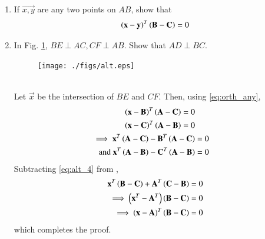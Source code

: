 \documentclass[journal,12pt,twocolumn]{IEEEtran}
\renewcommand\thesection{\arabic{section}}
\begin{document}
\begin{enumerate}[label=\thesection.\arabic*
,ref=\thesection.\theenumi]
\begin{equation}
\end{equation}
%
\item If $\vec{x,y}$ are any two points on $AB$, show that 
\begin{equation}
\label{eq:orth_any}
\left(\mathbf{x}-\mathbf{y}\right)^T\left(\mathbf{B}-\mathbf{C}\right) = 0
\end{equation}
%
\item In Fig. \ref{fig:alt}, $BE \perp AC, CF \perp AB$.  Show that $AD \perp BC$.
\begin{figure}[!hb]
\centering
\texttt{[image: ./figs/alt.eps]}
\caption{}
\label{fig:alt}
\end{figure}
\\
\solution Let $\vec{x}$ be the intersection of $BE$ and $CF$. Then, using 
\eqref{eq:orth_any},
\begin{align}
\label{eq:alt_1}
\begin{split}
\left(\mathbf{x}-\mathbf{B}\right)^T
\left(\mathbf{A}-\mathbf{C}\right) &= 0
\\
\left(\mathbf{x}-\mathbf{C}\right)^T
\left(\mathbf{A}-\mathbf{B}\right) &=0
\end{split}
\\
\label{eq:alt_3}
\implies \mathbf{x}^T\left(\mathbf{A}-\mathbf{C}\right)-\mathbf{B}^T\left(\mathbf{A}-\mathbf{C}\right) &= 0
\\
\text{and }\mathbf{x}^T\left(\mathbf{A}-\mathbf{B}\right)-\mathbf{C}^T\left(\mathbf{A}-\mathbf{B}\right) &= 0
\label{eq:alt_4}
\end{align}
%
Subtracting \eqref{eq:alt_4} from \label{eq:alt_3},
\begin{align}
\mathbf{x}^T\left(\mathbf{B}-\mathbf{C}\right) + \mathbf{A}^T\left(\mathbf{C}-\mathbf{B}\right) &= 0
\\
\implies \left(\mathbf{x}^T - \mathbf{A}^T\right)\left(\mathbf{B}-\mathbf{C}\right)  &= 0
\\
\implies \left(\mathbf{x} - \mathbf{A}\right)^T\left(\mathbf{B}-\mathbf{C}\right)  &= 0
\end{align}
%
which completes the proof.
\end{enumerate}
%
\end{document}
